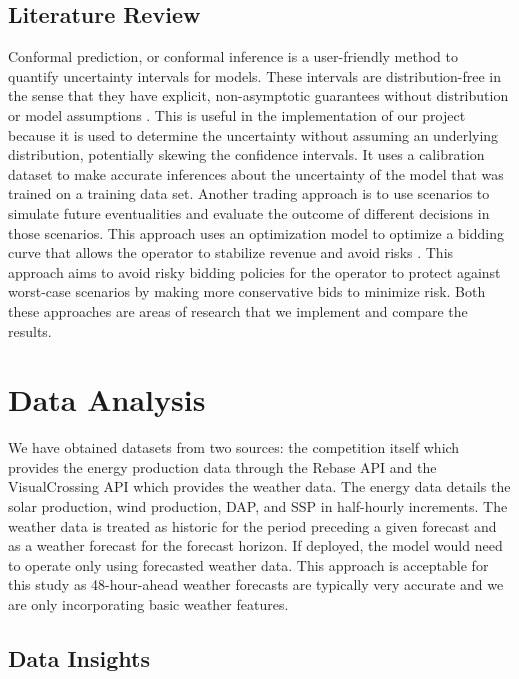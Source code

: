 \documentclass[
  journal,
]{IEEEtran}%
\begin{document}
\subsection{Literature Review}\label{literature-review}

Conformal prediction, or conformal inference is a user-friendly method
to quantify uncertainty intervals for models. These intervals are
distribution-free in the sense that they have explicit, non-asymptotic
guarantees without distribution or model assumptions
. This is
useful in the implementation of our project because it is used to
determine the uncertainty without assuming an underlying distribution,
potentially skewing the confidence intervals. It uses a calibration
dataset to make accurate inferences about the uncertainty of the model
that was trained on a training data set. Another trading approach is to
use scenarios to simulate future eventualities and evaluate the outcome
of different decisions in those scenarios. This approach uses an
optimization model to optimize a bidding curve that allows the operator
to stabilize revenue and avoid risks .
This approach aims to avoid risky bidding policies for the operator to
protect against worst-case scenarios by making more conservative bids to
minimize risk. Both these approaches are areas of research that we
implement and compare the results.

\section{Data Analysis}\label{data-analysis}

We have obtained datasets from two sources: the competition itself which
provides the energy production data through the Rebase API
 and the VisualCrossing API
 which provides the weather data.
The energy data details the solar production, wind production, DAP, and
SSP in half-hourly increments. The weather data is treated as historic
for the period preceding a given forecast and as a weather forecast for
the forecast horizon. If deployed, the model would need to operate only
using forecasted weather data. This approach is acceptable for this
study as 48-hour-ahead weather forecasts are typically very accurate and
we are only incorporating basic weather features.

\subsection{Data Insights}\label{data-insights}
\end{document}
